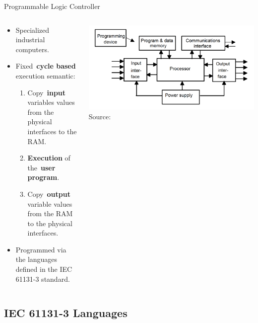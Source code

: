 \documentclass[18pt]{beamer}
\begin{document}
\begin{frame}{Programmable Logic Controller}
\begin{columns}
    \begin{column}{0.5\textwidth}
        \begin{itemize}
            \item Specialized industrial computers.
            \item Fixed~\textbf{cycle based} execution semantic:
            \begin{enumerate}
                \item Copy~\textbf{input} variables values from the physical interfaces to the RAM.
                \item \textbf{Execution} of the~\textbf{user program}.
                \item Copy~\textbf{output} variable values from the RAM to the physical interfaces.
            \end{enumerate}
            \item Programmed via the languages defined in the IEC 61131-3 standard.
        \end{itemize}
    \end{column}
    \begin{column}{0.5\textwidth}
        \includegraphics[width=\textwidth]{figures/PLC_Architecture.png}
        {\footnotesize Source:~\cite{BOLTON200653}}
    \end{column}
\end{columns}
\end{frame}

\subsection{IEC 61131-3 Languages}
\end{document}
